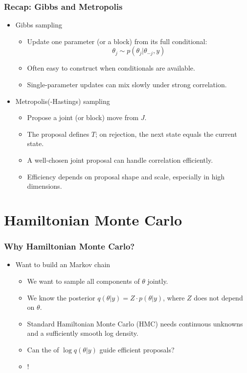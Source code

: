 \documentclass[10pt]{beamer}
\begin{document}
\begin{frame}
\frametitle{Recap: Gibbs and Metropolis}

\begin{itemize}
\item Gibbs sampling
\begin{itemize}
\item Update one parameter (or a block) from its full conditional:
\[
\theta_j \sim p(\theta_j|\theta_{-j}, y)
\]
\item[+] Often easy to construct when conditionals are available.
\item[-] Single-parameter updates can mix slowly under strong correlation.
\end{itemize}
\pause
\item Metropolis(-Hastings) sampling
\begin{itemize}
\item Propose a joint (or block) move from $J$.
\item The proposal  defines $T$;
  on rejection, the next state equals the current state.
\pause
\item[+] A well-chosen joint proposal can handle correlation efficiently.
\item[-] Efficiency depends on proposal shape and scale, especially in
  high dimensions.
\end{itemize}
\end{itemize}

\end{frame}


\section{Hamiltonian Monte Carlo}
\frame{\sectionpage}

\begin{frame}
\frametitle{Why Hamiltonian Monte Carlo?}

\begin{itemize}
\item Want to build an  Markov chain
\begin{itemize}
\item We want to sample all components of $\theta$ jointly.
\item We know the  posterior
  $q(\theta|y)=Z \cdot p(\theta|y)$, where $Z$ does not depend on $\theta$.
\item Standard Hamiltonian Monte Carlo (HMC) needs continuous unknowns and a sufficiently smooth
  log density.
\item Can the  of $\log q(\theta|y)$ guide efficient proposals?
\pause
\item {}!
\end{itemize}
\end{itemize}

\end{frame}
\end{document}
